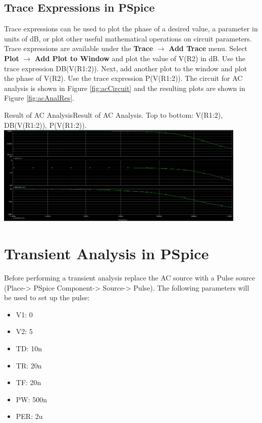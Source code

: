 \documentclass[12pt]{../manual}
\begin{document}
\subsection{Trace Expressions in PSpice}

Trace expressions can be used to plot the phase of a desired value, a parameter in units of dB, or plot other useful mathematical operations on circuit parameters. Trace expressions are available under the \textbf{Trace} $\to$ \textbf{Add Trace} menu. Select \textbf{Plot} $\to$ \textbf{Add Plot to Window} and plot the value of V(R2) in dB. Use the trace expression DB(V(R1:2)). Next, add another plot to the window and plot the phase of V(R2). Use the trace expression P(V(R1:2)). The circuit for AC analysis is shown in Figure \ref{fig:acCircuit} and the resulting plots are shown in Figure \ref{fig:acAnalRes}.

\begin{myfigure}[label=fig:acAnalRes]{Result of AC Analysis}{Result of AC Analysis. Top to bottom: V(R1:2), DB(V(R1:2)), P(V(R1:2)).}
\centering
\includegraphics[width=0.9\textwidth]{figures/ResultACAnalysisCrop.PNG}
\end{myfigure}
%
\section{Transient Analysis in PSpice}

Before performing a transient analysis replace the AC source with a Pulse source (Place-> PSpice Component-> Source-> Pulse). The following parameters will be used to set up the pulse:
\begin{itemize}
\item V1: 0
\item V2: 5
\item TD: 10n
\item TR: 20n
\item TF: 20n
\item PW: 500n
\item PER: 2u
\end{itemize}
\end{document}
